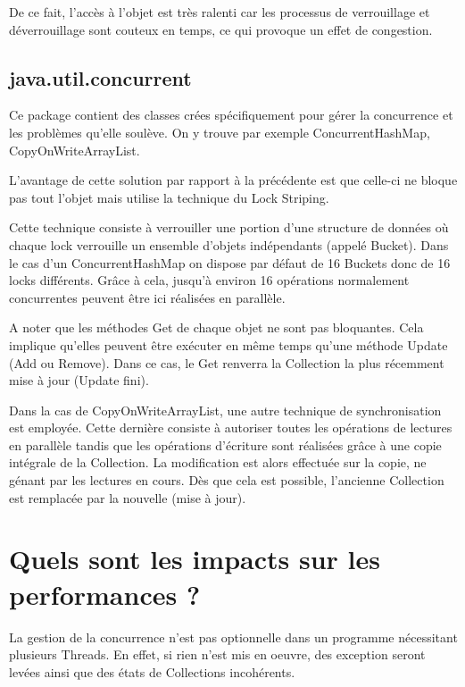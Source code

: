 \documentclass{report}
\begin{document}

			De ce fait, l'accès à l'objet est très ralenti car les processus de verrouillage et déverrouillage sont couteux en temps, ce qui provoque un effet de congestion.		

		\section{java.util.concurrent}

			Ce package contient des classes crées spécifiquement pour gérer la concurrence et les problèmes qu'elle soulève.
			On y trouve par exemple ConcurrentHashMap, CopyOnWriteArrayList.

			L'avantage de cette solution par rapport à la précédente est que celle-ci ne bloque pas tout l'objet mais utilise la technique du Lock Striping.


			Cette technique consiste à verrouiller une portion d'une structure de données où chaque lock verrouille un ensemble d'objets indépendants (appelé Bucket).
			Dans le cas d'un ConcurrentHashMap on dispose par défaut de 16 Buckets donc de 16 locks différents.
			Grâce à cela, jusqu'à environ 16 opérations normalement concurrentes peuvent être ici réalisées en parallèle.

			A noter que les méthodes Get de chaque objet ne sont pas bloquantes.
			Cela implique qu'elles peuvent être exécuter en même temps qu'une méthode Update (Add ou Remove).
			Dans ce cas, le Get renverra la Collection la plus récemment mise à jour (Update fini).
			

			Dans la cas de CopyOnWriteArrayList, une autre technique de synchronisation est employée.
			Cette dernière consiste à autoriser toutes les opérations de lectures en parallèle tandis que les opérations d'écriture sont réalisées grâce à une copie intégrale de la Collection.
			La modification est alors effectuée sur la copie, ne génant par les lectures en cours. Dès que cela est possible, l'ancienne Collection est remplacée par la nouvelle (mise à jour).

	\chapter{Quels sont les impacts sur les performances ?}

		La gestion de la concurrence n'est pas optionnelle dans un programme nécessitant plusieurs Threads. En effet, si rien n'est mis en oeuvre, des exception seront levées ainsi que des états de Collections incohérents. \\
\end{document}
